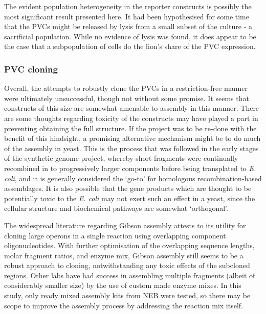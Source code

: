 The evident population heterogeneity in the reporter constructs is possibly the most significant result presented here. It had been hypothesised for some time that the PVCs might be released by lysis from a small subset of the culture - a sacrificial population. While no evidence of lysis was found, it does appear to be the case that a subpopulation of cells do the lion's share of the PVC expression.

\subsubsection{PVC cloning}
Overall, the attempts to robustly clone the PVCs in a restriction-free manner were ultimately unsuccessful, though not without some promise. It seems that constructs of this size are somewhat amenable to assembly in this manner. There are some thoughts regarding toxicity of the constructs may have played a part in preventing obtaining the full structure. If the project was to be re-done with the benefit of this hindsight, a promising alternative mechanism might be to do much of the assembly in yeast. This is the process that was followed in the early stages of the synthetic genome project, whereby short fragments were continually recombined in to progressively larger components before being transplated to \emph{E. coli}, and it is generally considered the `go-to' for homologous recombination-based assemblages. It is also possible that the gene products which are thought to be potentially toxic to the \emph{E. coli} may not exert such an effect in a yeast, since the cellular structure and biochemical pathways are somewhat `orthogonal'.

The widespread literature regarding Gibson assembly attests to its utility for cloning large operons in a single reaction using overlapping component oligonucleotides. With further optimisation of the overlapping sequence lengths, molar fragment ratios, and enzyme mix, Gibson assembly still seems to be a robust approach to cloning, notwithstanding any toxic effects of the subcloned regions. Other labs have had success in assembling multiple fragments (albeit of considerably smaller size) by the use of custom made enzyme mixes. In this study, only ready mixed assembly kits from NEB were tested, so there may be scope to improve the assembly process by addressing the reaction mix itself.

